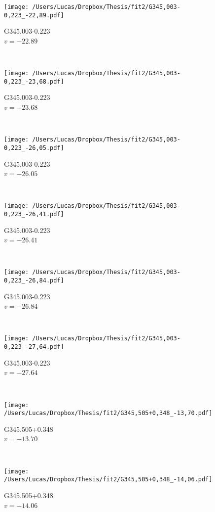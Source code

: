 \begin{figure*}[t]\ContinuedFloat
	\centering
	\begin{subfigure}[t]{0.3\textwidth}
		\texttt{[image: /Users/Lucas/Dropbox/Thesis/fit2/G345,003-0,223\_-22,89.pdf]}
		\caption[]{G345.003-0.223\\$v=-22.89$\,\kms}
	\end{subfigure}
	~
	\begin{subfigure}[t]{0.3\textwidth}
		\texttt{[image: /Users/Lucas/Dropbox/Thesis/fit2/G345,003-0,223\_-23,68.pdf]}
		\caption[]{G345.003-0.223\\$v=-23.68$\,\kms}
	\end{subfigure}
	~
	\begin{subfigure}[t]{0.3\textwidth}
		\texttt{[image: /Users/Lucas/Dropbox/Thesis/fit2/G345,003-0,223\_-26,05.pdf]}
		\caption[]{G345.003-0.223\\$v=-26.05$\,\kms}
	\end{subfigure}
	~
	\begin{subfigure}[t]{0.3\textwidth}
		\texttt{[image: /Users/Lucas/Dropbox/Thesis/fit2/G345,003-0,223\_-26,41.pdf]}
		\caption[]{G345.003-0.223\\$v=-26.41$\,\kms}
	\end{subfigure}
	~
	\begin{subfigure}[t]{0.3\textwidth}
		\texttt{[image: /Users/Lucas/Dropbox/Thesis/fit2/G345,003-0,223\_-26,84.pdf]}
		\caption[]{G345.003-0.223\\$v=-26.84$\,\kms}
	\end{subfigure}
	~
	\begin{subfigure}[t]{0.3\textwidth}
		\texttt{[image: /Users/Lucas/Dropbox/Thesis/fit2/G345,003-0,223\_-27,64.pdf]}
		\caption[]{G345.003-0.223\\$v=-27.64$\,\kms}
	\end{subfigure}
	~
	\begin{subfigure}[t]{0.3\textwidth}
		\texttt{[image: /Users/Lucas/Dropbox/Thesis/fit2/G345,505+0,348\_-13,70.pdf]}
		\caption[]{G345.505+0.348\\$v=-13.70$\,\kms}
	\end{subfigure}
	~
	\begin{subfigure}[t]{0.3\textwidth}
		\texttt{[image: /Users/Lucas/Dropbox/Thesis/fit2/G345,505+0,348\_-14,06.pdf]}
		\caption[]{G345.505+0.348\\$v=-14.06$\,\kms}

\end{subfigure}
\end{figure*}
